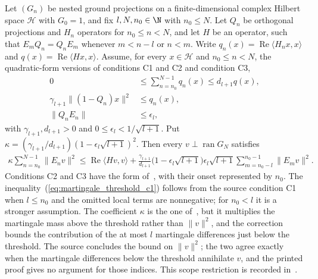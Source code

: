 \begin{theorem}
    \label{thm:martingale_threshold_estimate}
    \leanok
    Let $(G_n)$ be nested ground projections on a finite-dimensional complex Hilbert
    space $\mathcal H$ with $G_0=1$, and fix $l,N,n_0\in\N$ with $n_0\le N$. Let $Q_n$ be
    orthogonal projections and $H_n$ operators for $n_0\le n<N$, and let $H$ be an
    operator, such that $E_mQ_n=Q_nE_m$ whenever $m<n-l$ or $n<m$. Write
    $q_n(x)=\operatorname{Re}\langle H_nx,x\rangle$ and
    $q(x)=\operatorname{Re}\langle Hx,x\rangle$. Assume, for every $x\in\mathcal H$ and
    $n_0\le n<N$, the quadratic-form versions of conditions C1 and C2 and condition C3,
    \begin{align}
        0                                  & \le\sum_{n=n_0}^{N-1}q_n(x)\le d_{l+1}q(x),
        \label{eq:martingale_threshold_c1}                                               \\
        \gamma_{l+1}\lVert(1-Q_n)x\rVert^2 & \le q_n(x),
        \label{eq:martingale_threshold_c2}                                               \\
        \lVert Q_nE_n\rVert                & \le\epsilon_l,
        \label{eq:martingale_threshold_c3}
    \end{align}
    with $\gamma_{l+1},d_{l+1}>0$ and $0\le\epsilon_l<1/\sqrt{l+1}$. Put
    $\kappa=(\gamma_{l+1}/d_{l+1})(1-\epsilon_l\sqrt{l+1})^2$. Then every
    $v\perp\operatorname{ran}G_N$ satisfies
    \begin{align}
        \kappa\sum_{n=n_0}^{N-1}\lVert E_nv\rVert^2
        \le\operatorname{Re}\langle Hv,v\rangle
        +\frac{\gamma_{l+1}}{d_{l+1}}\bigl(1-\epsilon_l\sqrt{l+1}\bigr)\epsilon_l\sqrt{l+1}
        \sum_{m=n_0-l}^{n_0-1}\lVert E_mv\rVert^2.
        \label{eq:martingale_threshold_estimate}
    \end{align}
    Conditions C2 and C3 have the form of~\cite[lines
        1043--1058 and 1083--1094]{Nachtergaele1996Spectral}, with their onset represented
    by $n_0$. The inequality~(\ref{eq:martingale_threshold_c1}) follows
    from the source condition C1 when $l\le n_0$ and the omitted local terms are
    nonnegative; for $n_0<l$ it is a stronger assumption. The coefficient $\kappa$ is
    the one of~\cite[Theorem~2.1(i)]{Nachtergaele1996Spectral}, but it multiplies the
    martingale mass above the threshold rather than $\lVert v\rVert^2$, and the
    correction bounds the contribution of the at most $l$ martingale differences just
    below the threshold. The source concludes the bound on $\lVert v\rVert^2$; the two
    agree exactly when the martingale differences below the threshold annihilate $v$,
    and the printed proof gives no argument for those indices. This scope restriction
    is recorded in~\cite{gap:nachtergaele96_theorem_2_1_lower_endpoint}.
\end{theorem}
